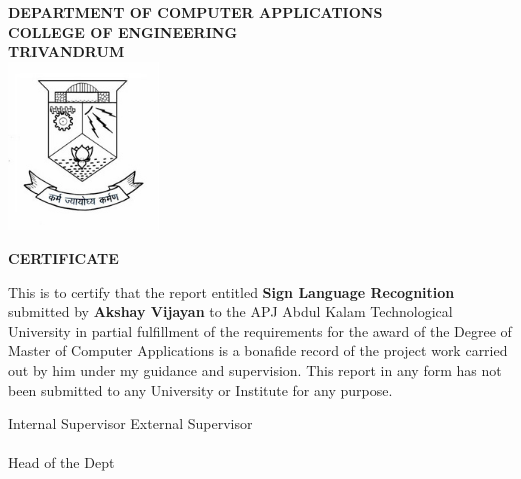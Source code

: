 \begin{titlepage}
\begin{center}

\textbf{DEPARTMENT OF COMPUTER APPLICATIONS}\\[0.5cm]
\textbf{ COLLEGE OF ENGINEERING \\ TRIVANDRUM}\\
[0.5cm]

\vspace{1.2cm}
\includegraphics[width=0.30\textwidth]{2.jpg}\\
\vspace{0.8cm}

\textbf{CERTIFICATE}\\
\end{center}

This is to certify that the report entitled 
\textbf{Sign Language Recognition} submitted by
\textbf{Akshay Vijayan} to the APJ Abdul Kalam Technological University in partial
fulfillment of the requirements for the award of the Degree of Master of
Computer Applications is a bonafide record of the project work carried out by
him under my guidance and supervision. This report in any form has not been
submitted to any University or Institute for any purpose.

\vspace{1 cm}

\noindent Internal Supervisor 
\hfill External Supervisor
\\ \\
Head of the Dept

\end{titlepage}
